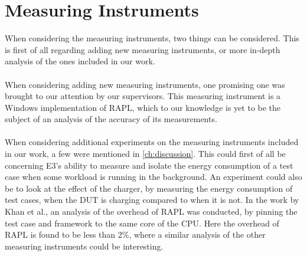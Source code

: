 \section{Measuring Instruments}

When considering the measuring instruments, two things can be considered. This is first of all regarding adding new measuring instruments, or more in-depth analysis of the ones included in our work.

\paragraph*{}
When considering adding new measuring instruments, one promising one was brought to our attention by our supervisors. This measuring instrument is a Windows implementation of RAPL, which to our knowledge is yet to be the subject of an analysis of the accuracy of its measurements.

\paragraph*{}
When considering additional experiments on the measuring instruments included in our work, a few were mentioned in \cref{ch:discussion}. This could first of all be concerning E3's ability to measure and isolate the energy consumption of a test case when some workload is running in the background. An experiment could also be to look at the effect of the charger, by measuring the energy consumption of test cases, when the DUT is charging compared to when it is not. In the work by Khan et al.\cite[]{RAPL_in_action}, an analysis of the overhead of RAPL was conducted, by pinning the test case and framework to the same core of the CPU. Here the overhead of RAPL is found to be less than $2\%$, where a similar analysis of the other measuring instruments could be interesting.